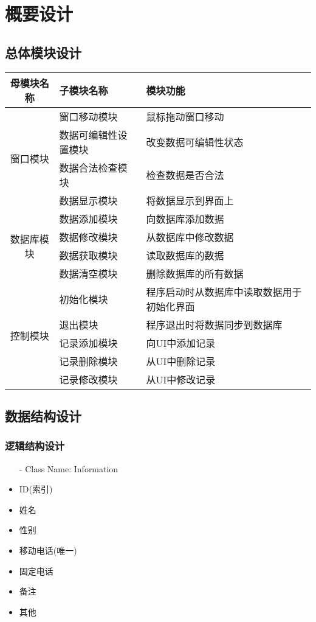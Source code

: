 \chapter{概要设计}
\section{总体模块设计}
	\begin{tabular}{|c|l|l|}
		\hline
		母模块名称& 子模块名称 & 模块功能 \\
		\hline 
		\multirow{4}{*}{ 窗口模块}
		& 窗口移动模块 & 鼠标拖动窗口移动 \\
		\cline{2-3}
		& 数据可编辑性设置模块 & 改变数据可编辑性状态 \\
		\cline{2-3}
		& 数据合法检查模块 & 检查数据是否合法 \\
		\cline{2-3}
		& 数据显示模块 & 将数据显示到界面上 \\
		\hline
		\multirow{4}{*}{
		数据库模块} 
		& 数据添加模块 & 向数据库添加数据 \\
		\cline{2-3}
		& 数据修改模块 & 从数据库中修改数据 \\
		\cline{2-3}
		& 数据获取模块 & 读取数据库的数据 \\
		\cline{2-3}
		& 数据清空模块 & 删除数据库的所有数据 \\
		\hline
		\multirow{5}{*}{控制模块}
		& 初始化模块 & 程序启动时从数据库中读取数据用于初始化界面 \\
		\cline{2-3}
		& 退出模块 & 程序退出时将数据同步到数据库 \\
		\cline{2-3}
		& 记录添加模块 & 向UI中添加记录 \\
		\cline{2-3}
		& 记录删除模块 & 从UI中删除记录 \\
		\cline{2-3}
		& 记录修改模块 & 从UI中修改记录 \\
		\hline
	\end{tabular}
\section{数据结构设计}
	\subsection{逻辑结构设计}
		\begin{itemize}
			\item[-] Class Name: Information
			\item ID(索引)
			\item 姓名
			\item 性别
			\item 移动电话(唯一)
			\item 固定电话
			\item 备注
			\item 其他
		\end{itemize}
